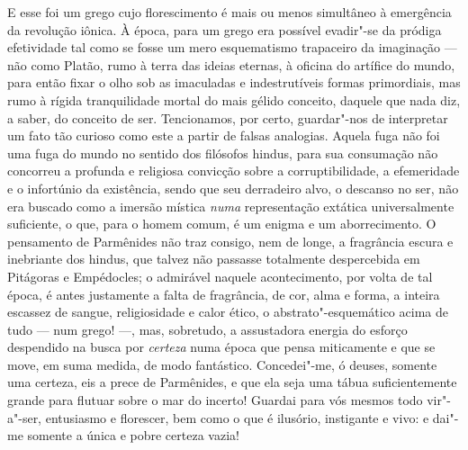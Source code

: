 E esse foi um grego cujo florescimento é mais ou menos simultâneo à emergência
da revolução iônica. À época, para um grego era possível evadir"-se da
pródiga efetividade tal como se fosse um mero esquematismo trapaceiro da
imaginação --- não como Platão, rumo à terra das ideias eternas, à oficina do
artífice do mundo, para então fixar o olho sob as imaculadas e indestrutíveis
formas primordiais, mas rumo à rígida tranquilidade mortal do mais gélido
conceito, daquele que nada diz, a saber, do conceito de ser. Tencionamos, por
certo, guardar"-nos de interpretar um fato tão curioso como este a partir de
falsas analogias. Aquela fuga não foi uma fuga do mundo no sentido dos
filósofos hindus, para sua consumação não concorreu a profunda e religiosa
convicção sobre a corruptibilidade, a efemeridade e o infortúnio da
existência, sendo que seu derradeiro alvo, o descanso no ser, não era buscado
como a imersão mística \textit{numa} representação extática universalmente
suficiente, o que, para o homem comum, é um enigma e um aborrecimento. O
pensamento de Parmênides não traz consigo, nem de longe, a fragrância escura
e inebriante dos hindus, que talvez não passasse totalmente despercebida em
Pitágoras e Empédocles; o admirável naquele acontecimento, por volta de tal
época, é antes justamente a falta de fragrância, de cor, alma e forma, a
inteira escassez de sangue, religiosidade e calor ético, o
abstrato"-esquemático acima de tudo --- num grego! ---, mas, sobretudo, a
assustadora energia do esforço despendido na busca por \textit{certeza} numa
época que pensa miticamente e que se move, em suma medida, de modo
fantástico. Concedei"-me, ó deuses, somente uma certeza, eis a prece de
Parmênides, e que ela seja uma tábua suficientemente grande para flutuar
sobre o mar do incerto! Guardai para vós mesmos todo vir"-a"-ser, entusiasmo
e florescer, bem como o que é ilusório, instigante e vivo: e dai"-me somente
a única e pobre certeza vazia!

